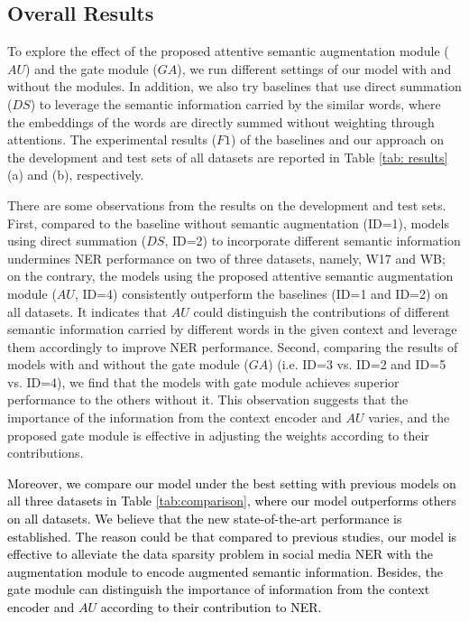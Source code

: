 \documentclass[11pt,a4paper]{article}
\begin{document}
\subsection{Overall Results}



To explore the effect of the proposed attentive semantic augmentation module (${AU}$) and the gate module (${GA}$), we run different settings of our model with and without the modules.
In addition, we also try baselines that use direct summation ($DS$) to leverage the semantic information carried by the similar words, where the embeddings of the words are directly summed without weighting through attentions.
The experimental results ($F1$) of the baselines and our approach on the development and test sets of all datasets are reported in Table \ref{tab: results}(a) and (b), respectively.


There are some observations from the results on the development and test sets.
First, compared to the baseline without semantic augmentation (ID=1), models using direct summation ($DS$, ID=2) to incorporate different semantic information undermines NER performance on two of three datasets, namely, W17 and WB;
on the contrary, the models using the proposed attentive semantic augmentation module ($AU$, ID=4) consistently outperform the baselines (ID=1 and ID=2) on 
all datasets.
It indicates that $AU$ could distinguish the contributions of different semantic information carried by different words in the given context and leverage them accordingly to improve NER performance.
Second, comparing the results of models with and without the gate module (${GA}$) (i.e. ID=3 vs. ID=2 and ID=5 vs. ID=4), we find that the models with gate module achieves superior performance to the others without it.
This observation suggests that the importance of the information from the context encoder and ${AU}$ varies, and the proposed gate module is effective in adjusting the weights according to their contributions.





\textcolor{black}{
Moreover, we compare our model under the best setting with previous models on all three datasets in Table \ref{tab:comparison}, where our model outperforms others on all datasets.
We believe that the new state-of-the-art performance is established.
The reason could be that compared to previous studies, our model is effective to alleviate the data sparsity problem in social media NER with the augmentation module to encode augmented semantic information.
Besides, the gate module can distinguish the importance of information from the context encoder and ${AU}$ according to their contribution to NER. 
}
\end{document}
